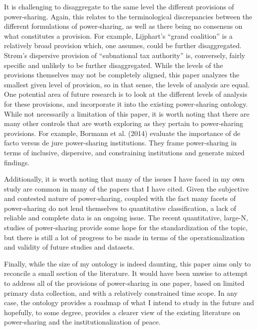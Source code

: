 \documentclass[12pt]{article}
\begin{document}
It is challenging to disaggregate to the same level the different provisions of power-sharing. Again, this relates to the terminological discrepancies between the different formulations of power-sharing, as well as there being no consensus on what constitutes a provision. For example, Lijphart’s “grand coalition” is a relatively broad provision which, one assumes, could be further disaggregated. Strøm’s dispersive provision of “subnational tax authority” is, conversely, fairly specific and unlikely to be further disaggregated. While the levels of the provisions themselves may not be completely aligned, this paper analyzes the smallest given level of provision, so in that sense, the levels of analysis are equal. One potential area of future research is to look at the different levels of analysis for these provisions, and incorporate it into the existing power-sharing ontology. While not necessarily a limitation of this paper, it is worth noting that there are many other controls that are worth exploring as they pertain to power-sharing provisions. For example, Bormann et al. (2014) evaluate the importance of de facto versus de jure power-sharing institutions. They frame power-sharing in terms of inclusive, dispersive, and constraining institutions and generate mixed findings. 

Additionally, it is worth noting that many of the issues I have faced in my own study are common in many of the papers that I have cited. Given the subjective and contested nature of power-sharing, coupled with the fact many facets of power-sharing do not lend themselves to quantitative classification, a lack of reliable and complete data is an ongoing issue. The recent quantitative, large-N, studies of power-sharing provide some hope for the standardization of the topic, but there is still a lot of progress to be made in terms of the operationalization and validity of future studies and datasets.  

Finally, while the size of my ontology is indeed daunting, this paper aims only to reconcile a small section of the literature. It would have been unwise to attempt to address all of the provisions of power-sharing in one paper, based on limited primary data collection, and with a relatively constrained time scope. In any case, the ontology provides a roadmap of what I intend to study in the future and hopefully, to some degree, provides a clearer view of the existing literature on power-sharing and the institutionalization of peace.  
\end{document}
